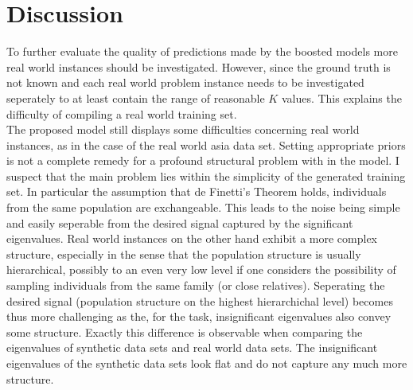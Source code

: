 \documentclass[a4paper, 11pt]{article}
\begin{document}
\section{Discussion}
To further evaluate the quality of predictions made by the boosted models more real world instances should be investigated. However, since the ground truth is not known and each real world problem instance needs to be investigated seperately to at least contain the range of reasonable $K$ values. This explains the difficulty of compiling a real world training set.\\
The proposed model still displays some difficulties concerning real world instances, as in the case of the real world asia data set. Setting appropriate priors is not a complete remedy for a profound structural problem with in the model. I suspect that the main problem lies within the simplicity of the generated training set. In particular the assumption that de Finetti's Theorem holds, individuals from the same population are exchangeable. This leads to the noise being simple and easily seperable from the desired signal captured by the significant eigenvalues. Real world instances on the other hand exhibit a more complex structure, especially in the sense that the population structure is usually hierarchical, possibly to an even very low level if one considers the possibility of sampling individuals from the same family (or close relatives). Seperating the desired signal (population structure on the highest hierarchichal level) becomes thus more challenging as the, for the task, insignificant eigenvalues also convey some structure. Exactly this difference is observable when comparing the eigenvalues of synthetic data sets and real world data sets. The insignificant eigenvalues of the synthetic data sets look flat and do not capture any much more structure.\\
\end{document}
